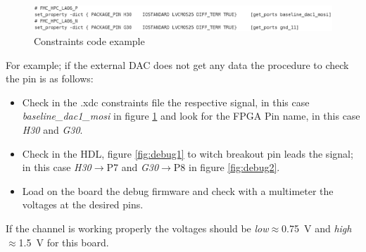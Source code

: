 \begin{figure}[H]
\centering
\includegraphics[width=0.9\linewidth]{IMG/ch3/DEBUG3}
\caption{Constraints code example}
\label{fig:debug3}
\end{figure}
\noindent For example; if the external DAC does not get any data the procedure to check the pin is as follows:
\begin{itemize}
	\item Check in the .xdc constraints file the respective signal, in this case \textit{baseline\_dac1\_mosi} in figure \ref{fig:debug3} and look for the FPGA Pin name, in this case \textit{H30} and \textit{G30}.
	\item Check in the HDL, figure \ref{fig:debug1} to witch breakout pin leads the signal; in this case \textit{H30}$\rightarrow$P7 and \textit{G30}$\rightarrow$P8 in figure \ref{fig:debug2}.
	\item Load on the board the debug firmware and check with a multimeter the voltages at the desired pins.    
\end{itemize}
\noindent If the channel is working properly the voltages should be \textit{low}$\approx$0.75~V and \textit{high}$\approx$1.5~V for this board.  
































